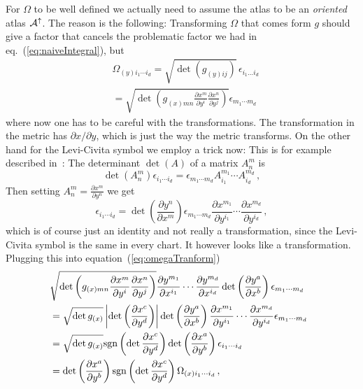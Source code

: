 \documentclass[11pt, a4paper, twocolumn]{article} %
\begin{document}
    For $\Omega$ to be well defined we actually need to assume the atlas to be an \textit{oriented}
    atlas $\mathcal{A}^\uparrow$.
    The reason is the following:
    Transforming $\Omega$ that comes form $g$ should give a factor that cancels the problematic factor
    we had in eq.~(\ref{eq:naiveIntegral}), but
    \begin{align}
        \label{eq:omegaTranform}&\Omega_{(y)i_1\cdots i_d} = \sqrt{\det(g_{(y)ij})}\, \epsilon_{i_1\ldots i_d}\\
            \nonumber&= \sqrt{\det\left( g_{(x)mn}\frac{\partial x^m}{\partial y^i}\frac{\partial x^n}{\partial y^j} \right)}
                \epsilon_{m_1\cdots m_d}
    \end{align}
    where now one has to be careful with the transformations.
    The transformation in the metric has $\partial x / \partial y$, which is just the way the metric transforms.
    On the other hand for the Levi-Civita symbol we employ a trick now:
    This is for example described in~\cite{Carroll}:
    The determinant $\det(A)$ of a matrix $A^m_n$ is
    \begin{equation}
        \det(A^m_n) \epsilon_{i_1\cdots i_d} = \epsilon_{m_1\cdots m_d}A^{m_1}_{i_1}\cdots A^{m_d}_{i_d}\,,
    \end{equation}
    Then setting $A^m_n = \frac{\partial x^m}{\partial y^n}$ we get
    \begin{equation}
        \epsilon_{i_1\cdots i_d} = \det\left( \frac{\partial y^n}{\partial x^m} \right)
        \epsilon_{m_1\cdots m_d} \frac{\partial x^{m_1}}{\partial y^{i_1}}\cdots \frac{\partial x^{m_d}}{\partial y^{i_d}}\,,
    \end{equation}
    which is of course just an identity and not really a transformation, since the Levi-Civita symbol is the same in
    every chart.
    It however looks like a transformation.
    Plugging this into equation~(\ref{eq:omegaTranform})
    \begin{align}
        \nonumber &\sqrt{\det\left( g_{(x)mn}\frac{\partial x^m}{\partial y^i}\frac{\partial x^n}{\partial y^j} \right)}
        \frac{\partial y^{m_1}}{\partial x^{i_1}}\cdots \frac{\partial y^{m_d}}{\partial x^{i_d}}
        \det\left( \frac{\partial y^a}{\partial x^b} \right) \epsilon_{m_1\cdots m_d} \MoveEqLeft[2]\\
        \nonumber &= 
         \sqrt{\det g_{(x)}} \left| \det \left( \frac{\partial x^c}{\partial y^d} \right)\right|
        \det\left( \frac{\partial y^a}{\partial x^b} \right)
        \frac{\partial x^{m_1}}{\partial y^{i_1}}\cdots \frac{\partial x^{m_d}}{\partial y^{i_d}}
         \epsilon_{m_1\cdots m_d}\\
         \nonumber&=  \sqrt{\det g_{(x)}} 
         \mathrm{sgn}\left( \det \frac{\partial x^c}{\partial y^d} \right) 
         \det \left( \frac{\partial x^a}{\partial y^b}\right)
         \epsilon_{i_1\cdots i_d}\\
         &= 
         \det \left( \frac{\partial x^a}{\partial y^b}\right)
         \mathrm{sgn}\left( \det \frac{\partial x^c}{\partial y^d} \right) 
         \Omega_{(x)i_1\cdots i_d}\,,
         \label{eq:OmegaTransform}
    \end{align}
\end{document}
